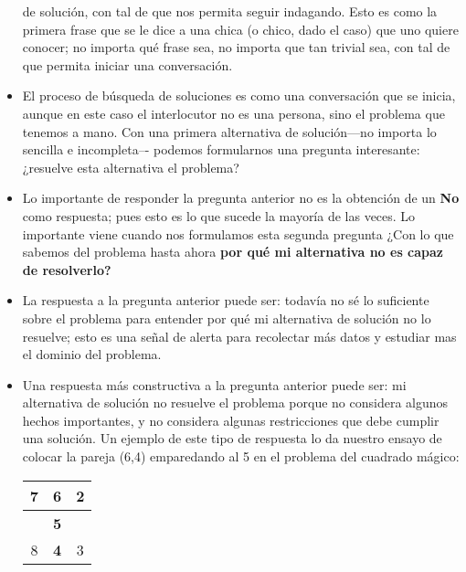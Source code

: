 \begin{itemize}
de solución, con tal de que nos permita seguir indagando. Esto es
como la primera frase que se le dice a una chica (o chico, dado el
caso) que uno quiere conocer; no importa qué frase sea, no importa
que tan trivial sea, con tal de que permita iniciar una conversación.
\item El proceso de búsqueda de soluciones es como una conversación que
se inicia, aunque en este caso el interlocutor no es una persona,
sino el problema que tenemos a mano. Con una primera alternativa de
solución—no importa lo sencilla e incompleta–- podemos formularnos
una pregunta interesante: ¿resuelve esta alternativa el problema?
\item Lo importante de responder la pregunta anterior no es la obtención
de un \textbf{No} como respuesta; pues esto es lo que sucede la mayoría
de las veces. Lo importante viene cuando nos formulamos esta segunda
pregunta ¿Con lo que sabemos del problema hasta ahora \textbf{por
qué mi alternativa no es capaz de resolverlo?}
\item La respuesta a la pregunta anterior puede ser: todavía no sé lo suficiente
sobre el problema para entender por qué mi alternativa de solución
no lo resuelve; esto es una señal de alerta para recolectar más datos
y estudiar mas el dominio del problema.
\item Una respuesta más constructiva a la pregunta anterior puede ser: mi
alternativa de solución no resuelve el problema porque no considera
algunos hechos importantes, y no considera algunas restricciones que
debe cumplir una solución. Un ejemplo de este tipo de respuesta lo
da nuestro ensayo de colocar la pareja (6,4) emparedando al 5 en el
problema del cuadrado mágico:

\begin{center}
\begin{tabular}{|c|c|c|}
\hline 
7  & \textbf{6}  & 2\tabularnewline
\hline 
 & \textbf{5}  & \tabularnewline
\hline 
8  & \textbf{4}  & 3 \tabularnewline
\hline 
\end{tabular}
\par\end{center}


\end{itemize}

